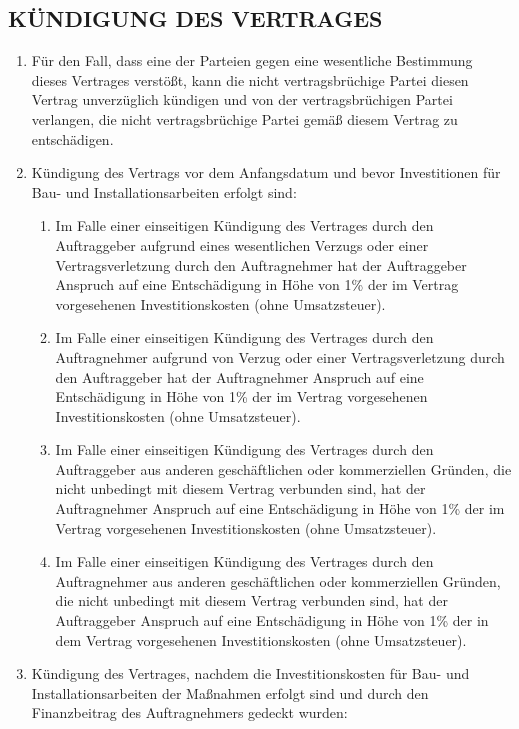 \begin{multicols}{2}
   \subsection{KÜNDIGUNG DES VERTRAGES}
   \begin{enumerate}
   \item Für den Fall, dass eine der Parteien gegen eine wesentliche Bestimmung dieses Vertrages verstößt, kann die nicht vertragsbrüchige Partei diesen Vertrag unverzüglich kündigen und von der vertragsbrüchigen Partei verlangen, die nicht vertragsbrüchige Partei gemäß diesem Vertrag zu entschädigen.
   \item Kündigung des Vertrags vor dem Anfangsdatum und bevor  Investitionen für Bau- und Installationsarbeiten erfolgt sind:
   \begin{enumerate}
   \item Im Falle einer einseitigen Kündigung des Vertrages durch den Auftraggeber aufgrund eines wesentlichen Verzugs oder einer Vertragsverletzung durch den Auftragnehmer hat der Auftraggeber Anspruch auf eine Entschädigung in Höhe von 1\% der im Vertrag vorgesehenen Investitionskosten (ohne Umsatzsteuer).
   \item Im Falle einer einseitigen Kündigung des Vertrages durch den Auftragnehmer aufgrund von Verzug oder einer Vertragsverletzung durch den Auftraggeber hat der Auftragnehmer Anspruch auf eine Entschädigung in Höhe von 1\% der im Vertrag vorgesehenen Investitionskosten (ohne Umsatzsteuer).
   \item Im Falle einer einseitigen Kündigung des Vertrages durch den Auftraggeber aus anderen geschäftlichen oder kommerziellen Gründen, die nicht unbedingt mit diesem Vertrag verbunden sind, hat der Auftragnehmer Anspruch auf eine Entschädigung in Höhe von 1\% der im Vertrag vorgesehenen Investitionskosten (ohne Umsatzsteuer).
   \item Im Falle einer einseitigen Kündigung des Vertrages durch den Auftragnehmer aus anderen geschäftlichen oder kommerziellen Gründen, die nicht unbedingt mit diesem Vertrag verbunden sind, hat der Auftraggeber Anspruch auf eine Entschädigung in Höhe von 1\% der in dem Vertrag vorgesehenen Investitionskosten (ohne Umsatzsteuer).
   \end{enumerate}
   \item Kündigung des Vertrages, nachdem die Investitionskosten für Bau- und Installationsarbeiten der Maßnahmen erfolgt sind und durch den Finanzbeitrag des Auftragnehmers gedeckt wurden:
   \begin{enumerate}

\end{enumerate}
\end{enumerate}
\end{multicols}
